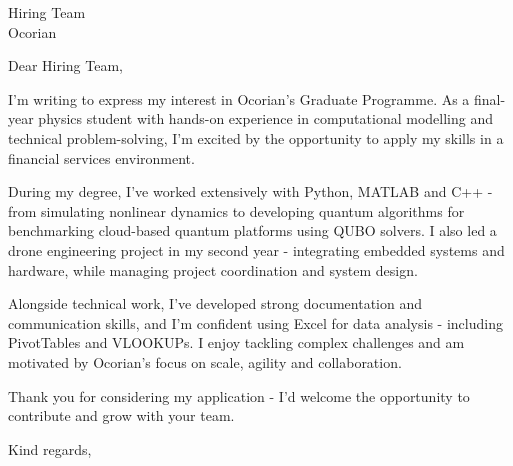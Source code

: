 \documentclass[a4paper,11pt]{letter}
\date{\today}
\begin{document}
\begin{letter}{Hiring Team\\Ocorian}

\opening{Dear Hiring Team,}

I'm writing to express my interest in Ocorian’s Graduate Programme. As a final-year physics student with hands-on experience in computational modelling and technical problem-solving, I’m excited by the opportunity to apply my skills in a financial services environment.

During my degree, I’ve worked extensively with Python, MATLAB and C++ - from simulating nonlinear dynamics to developing quantum algorithms for benchmarking cloud-based quantum platforms using QUBO solvers. I also led a drone engineering project in my second year - integrating embedded systems and hardware, while managing project coordination and system design.

Alongside technical work, I’ve developed strong documentation and communication skills, and I’m confident using Excel for data analysis - including PivotTables and VLOOKUPs. I enjoy tackling complex challenges and am motivated by Ocorian’s focus on scale, agility and collaboration.

Thank you for considering my application - I’d welcome the opportunity to contribute and grow with your team.

\closing{Kind regards,}

\end{letter}
\end{document}
